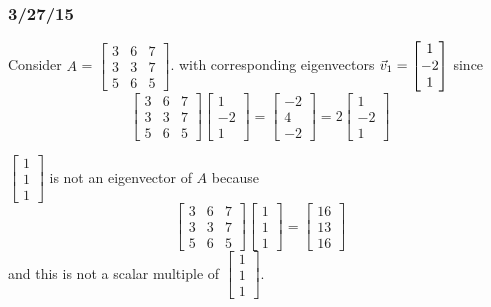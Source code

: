 \documentclass[english, 12pt]{article}
\begin{document}
\subsubsection*{3/27/15}

\begin{exmp}
Consider $A$ = $\begin{bmatrix} 3 & 6 & 7 \\ 3 & 3 & 7 \\ 5 & 6 & 5 \end{bmatrix}$. with corresponding eigenvectors $\vec{v}_{1} = \begin{bmatrix} 1 \\ -2 \\ 1 \end{bmatrix}$ since
\[\begin{bmatrix} 3 & 6 & 7 \\ 3 & 3 & 7 \\ 5 & 6 & 5 \end{bmatrix} \begin{bmatrix} 1 \\ -2 \\ 1 \end{bmatrix} = \begin{bmatrix} -2 \\ 4 \\ -2 \end{bmatrix} = 2 \begin{bmatrix} 1 \\ -2 \\ 1 \end{bmatrix}\]
\end{exmp}

\begin{exmp}
$\begin{bmatrix} 1 \\ 1 \\ 1 \end{bmatrix}$ is not an eigenvector of $A$ because
\[\begin{bmatrix} 3 & 6 & 7 \\ 3 & 3 & 7 \\ 5 & 6 & 5 \end{bmatrix} \begin{bmatrix} 1 \\ 1 \\ 1 \end{bmatrix} = \begin{bmatrix} 16 \\ 13 \\ 16 \end{bmatrix}\]
and this is not a scalar multiple of $\begin{bmatrix} 1 \\ 1 \\ 1 \end{bmatrix}$.
\end{exmp}
\end{document}

